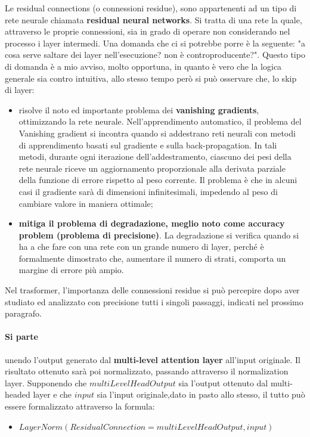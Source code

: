Le residual connections (o connessioni residue), sono appartenenti ad un tipo di rete neurale chiamata \textbf{residual neural networks}. Si tratta di una rete la quale, attraverso le proprie connessioni, sia in grado di operare non considerando nel processo i layer intermedi. Una domanda che ci si potrebbe porre è la seguente: "a cosa serve saltare dei layer nell'esecuzione? non è controproducente?". Questo tipo di domanda è a mio avviso, molto opportuna, in quanto è vero che la logica generale sia contro intuitiva, allo stesso tempo però si può osservare che, lo skip di layer:
\begin{itemize}
	\item risolve il noto ed importante problema dei \textbf{vanishing gradients}, ottimizzando la rete neurale. Nell'apprendimento automatico, il problema del Vanishing gradient si incontra quando si addestrano reti neurali con metodi di apprendimento basati sul gradiente e sulla back-propagation. In tali metodi, durante ogni iterazione dell'addestramento, ciascuno dei pesi della rete neurale riceve un aggiornamento proporzionale alla derivata parziale della funzione di errore rispetto al peso corrente. Il problema è che in alcuni casi il gradiente sarà di dimensioni infinitesimali, impedendo al peso di cambiare valore in maniera ottimale;
	\item \textbf{mitiga il problema di degradazione, meglio noto come accuracy problem (problema di precisione)}. La degradazione si verifica quando si ha a che fare con una rete con un grande numero di layer, perché è formalmente dimostrato che, aumentare il numero di strati, comporta un margine di errore più ampio. 
\end{itemize} 
Nel trasformer, l'importanza delle connessioni residue si può percepire dopo aver studiato ed analizzato con precisione tutti i singoli passaggi, indicati nel prossimo paragrafo.
 \paragraph{Si parte} unendo l'output generato dal \textbf{multi-level attention layer} all'input originale. Il risultato ottenuto sarà poi normalizzato, passando attraverso il normalization layer. Supponendo che $multiLevelHeadOutput$ sia l'output ottenuto dal multi-headed layer e che $input$ sia l'input originale,dato in pasto allo stesso, il tutto può essere formalizzato attraverso la formula:
\begin{itemize}
	\item $ LayerNorm(ResidualConnection = multiLevelHeadOutput, input)$
\end{itemize}

